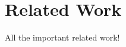 \setchaptertoc
\chapter{Related Work}\label{chp:related-work}
\begin{summary}
   All the important related work!
\end{summary}



